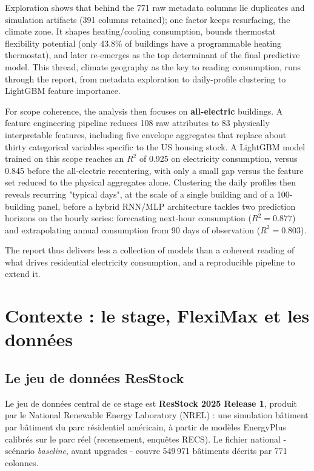 Exploration shows that behind the 771 raw metadata columns lie duplicates and simulation
artifacts (391 columns retained); one factor keeps resurfacing, the climate zone. It shapes
heating/cooling consumption, bounds thermostat flexibility potential (only 43.8\% of buildings
have a programmable heating thermostat), and later re-emerges as the top determinant of the
final predictive model. This thread, climate geography as the key to reading consumption, 
runs through the report, from metadata exploration to daily-profile clustering to LightGBM
feature importance.

For scope coherence, the analysis then focuses on \textbf{all-electric} buildings. A feature
engineering pipeline reduces 108 raw attributes to 83 physically interpretable features, including
five envelope aggregates that replace about thirty categorical variables specific to the US
housing stock. A LightGBM model trained on this scope reaches an $R^2$ of 0.925 on electricity
consumption, versus 0.845 before the all-electric recentering, with only a small gap versus
the feature set reduced to the physical aggregates alone. Clustering the daily profiles then
reveals recurring "typical days", at the scale of a single building and of a 100-building panel,
before a hybrid RNN/MLP architecture tackles two prediction horizons on the hourly series:
forecasting next-hour consumption ($R^2=0.877$) and extrapolating annual consumption from 90 days
of observation ($R^2=0.803$).

The report thus delivers less a collection of models than a coherent reading of what drives
residential electricity consumption, and a reproducible pipeline to extend it.

\enlargethispage{2\baselineskip}
\tableofcontents
\listoffigures
\listoftables
\chapter{Contexte : le stage, FlexiMax et les données}
\label{ch:contexte}

\section{Le jeu de données ResStock}
\label{sec:jeu-donnees-resstock}
Le jeu de données central de ce stage est \textbf{ResStock 2025 Release 1}, produit par le
National Renewable Energy Laboratory (NREL) : une simulation bâtiment par bâtiment du parc
résidentiel américain, à partir de modèles EnergyPlus calibrés sur le parc réel (recensement,
enquêtes RECS). Le fichier national  - scénario \emph{baseline}, avant
upgrades - couvre 549\,971 bâtiments décrits par 771 colonnes.

